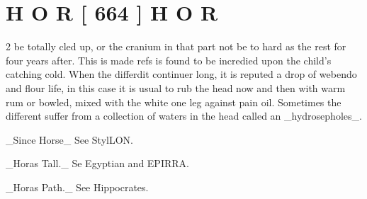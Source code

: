 \documentclass[10pt]{article}
\begin{document}
\section*{\centering H O R [ 664 ] H O R}
\begin{multicols}{2}\raggedcolumns
be totally cled up, or the cranium in that part not be to hard as the rest for four years after. This is made refs is found to be incredied upon the child’s catching cold. When the differdit continuer long, it is reputed a drop of webendo and flour life, in this case it is usual to rub the head now and then with warm rum or bowled, mixed with the white one leg against pain oil. Sometimes the different suffer from a collection of waters in the head called an \_hydrosepholes\_.

\_Since Horse\_ See StylLON.

\_Horas Tall.\_ Se Egyptian and EPIRRA.

\_Horas Path.\_ See Hippocrates.


\end{multicols}
\end{document}
